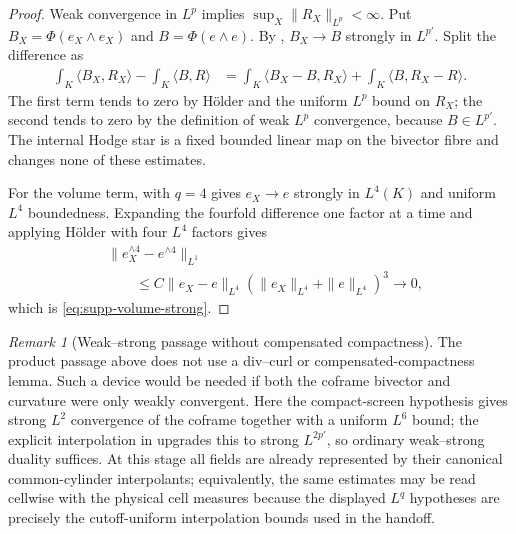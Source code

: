 \documentclass[11pt]{article}
\numberwithin{equation}{section}
\theoremstyle{definition}
\theoremstyle{remark}
\newtheorem{remark}[remark]{Remark}
\begin{document}
\begin{proof}
Weak convergence in $L^p$ implies $\sup_X\|R_X\|_{L^p}<\infty$.  Put
$B_X=\Phi(e_X\wedge e_X)$ and $B=\Phi(e\wedge e)$.  By
, $B_X\to B$ strongly in $L^{p'}$.
Split the difference as
\begin{align}
 \int_K\langle B_X,R_X\rangle-\int_K\langle B,R\rangle
 &=\int_K\langle B_X-B,R_X\rangle
   +\int_K\langle B,R_X-R\rangle.
 \label{eq:supp-pairing-split}
\end{align}
The first term tends to zero by H\"older and the uniform $L^p$ bound on
$R_X$; the second tends to zero by the definition of weak $L^p$ convergence,
because $B\in L^{p'}$.  The internal Hodge star is a fixed bounded linear map
on the bivector fibre and changes none of these estimates.

For the volume term,  with $q=4$ gives
$e_X\to e$ strongly in $L^4(K)$ and uniform $L^4$ boundedness.  Expanding the
fourfold difference one factor at a time and applying H\"older with four
$L^4$ factors gives
\begin{align}
 &\|e_X^{\wedge4}-e^{\wedge4}\|_{L^1} \\
 &\qquad\le C\|e_X-e\|_{L^4}
 (\|e_X\|_{L^4}+\|e\|_{L^4})^3\longrightarrow0,
\end{align}
which is \eqref{eq:supp-volume-strong}.
\end{proof}

\begin{remark}[Weak--strong passage without compensated compactness]
\label{rem:supp-no-divcurl}
The product passage above does not use a div--curl or compensated-compactness
lemma.  Such a device would be needed if both the coframe bivector and curvature
were only weakly convergent.  Here the compact-screen hypothesis gives strong
$L^2$ convergence of the coframe together with a uniform $L^6$ bound; the
explicit interpolation in  upgrades this
to strong $L^{2p'}$, so ordinary weak--strong duality suffices.  At this stage
all fields are already represented by their canonical common-cylinder
interpolants; equivalently, the same estimates may be read cellwise with the
physical cell measures because the displayed $L^q$ hypotheses are precisely
the cutoff-uniform interpolation bounds used in the handoff.
\end{remark}
\end{document}

